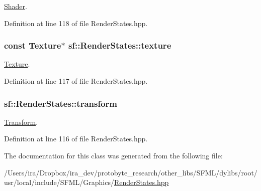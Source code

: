 \hyperlink{classsf_1_1_shader}{Shader}. 



Definition at line 118 of file Render\-States.\-hpp.

\hypertarget{classsf_1_1_render_states_a457fc5a41731889de9cf39cf9b3436c3}{
\subsubsection[{texture}]{\setlength{\rightskip}{0pt plus 5cm}const {\bf Texture}$\ast$ sf\-::\-Render\-States\-::texture}}\label{classsf_1_1_render_states_a457fc5a41731889de9cf39cf9b3436c3}


\hyperlink{classsf_1_1_texture}{Texture}. 



Definition at line 117 of file Render\-States.\-hpp.

\hypertarget{classsf_1_1_render_states_a1f737981a0f2f0d4bb8dac866a8d1149}{
\subsubsection[{transform}]{ sf\-::\-Render\-States\-::transform}}\label{classsf_1_1_render_states_a1f737981a0f2f0d4bb8dac866a8d1149}


\hyperlink{classsf_1_1_transform}{Transform}. 



Definition at line 116 of file Render\-States.\-hpp.



The documentation for this class was generated from the following file\-:\begin{DoxyCompactItemize}
\item 
/\-Users/ira/\-Dropbox/ira\-\_\-dev/protobyte\-\_\-research/other\-\_\-libs/\-S\-F\-M\-L/dylibs/root/usr/local/include/\-S\-F\-M\-L/\-Graphics/\hyperlink{_render_states_8hpp}{Render\-States.\-hpp}\end{DoxyCompactItemize}
